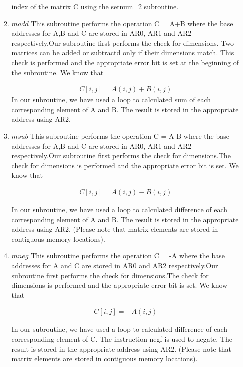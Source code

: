 \documentclass[a4paper,12pt]{article}
\begin{document}
\begin{enumerate}
\begin{flushleft}
\begin{enumerate}
\begin{flushleft}
     index of the matrix C using the setnum\_2 subroutine. 
    \end{flushleft}
    \item
    \begin{flushleft}
     $madd $ This subroutine performs the operation C = A+B where the base addresses for A,B and C are stored in AR0, AR1
     and AR2 respectively.Our subroutine first performs the check for dimensions. Two matrices can be added or subtractd only
     if their dimensions match. This check is performed and the appropriate error bit is set at the beginning of the subroutine.
     We know that 
    \end{flushleft}
    \begin{align}
     C[i,j] = A(i,j)+B(i,j) \nonumber
    \end{align}
    In our subroutine,  we have used a loop to calculated sum of each corresponding element of A and B. The result is stored
    in the appropriate address using AR2. 
    \item
    \begin{flushleft}
     $msub $ This subroutine performs the operation C = A-B where the base addresses for A,B and C are stored in AR0, AR1
     and AR2 respectively.Our subroutine first performs the check for dimensions.The check for dimensions is performed
     and the appropriate error bit is set.
     We know that 
    \end{flushleft}
    \begin{align}
     C[i,j] = A(i,j)-B(i,j) \nonumber
    \end{align}
    \begin{flushleft}
     In our subroutine,  we have used a loop to calculated difference of each corresponding element of A and B. The result is stored
    in the appropriate address using AR2. (Please note that matrix elements are stored in contiguous memory locations).

    \end{flushleft}
    \item
    \begin{flushleft}
     $mneg $ This subroutine performs the operation C = -A where the base addresses for A and C are stored in AR0
     and AR2 respectively.Our subroutine first performs the check for dimensions.The check for dimensions is performed
     and the appropriate error bit is set.
     We know that 
    \end{flushleft}
    \begin{align}
     C[i,j] = -A(i,j) \nonumber
    \end{align}
    \begin{flushleft}
    In our subroutine,  we have used a loop to calculated difference of each corresponding element of C. The instruction negf
    is used to negate. The result is stored in the appropriate address using AR2. (Please note that matrix elements are stored
    in contiguous memory locations).


\end{flushleft}
\end{enumerate}
\end{flushleft}
\end{enumerate}
\end{document}
